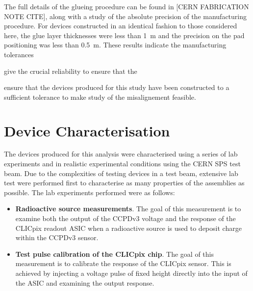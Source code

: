 The full details of the glueing procedure can be found in [CERN FABRICATION NOTE CITE], along with a study of the absolute precision of the manufacturing procedure.  For devices constructed in an identical fashion to those considered here, the glue layer thicknesses were less than 1~{\mu}m and the precision on the pad positioning was less than 0.5~{\mu}m.  These results indicate the manufacturing tolerances 

give the crucial reliability to ensure that the 

ensure that the devices produced for this study have been constructed to a sufficient  tolerance to make study of the misalignement feasible.  


\section{Device Characterisation}
The devices produced for this analysis were characterised using a series of lab experiments and in realistic experimental conditions using the CERN SPS test beam.  Due to the complexities of testing devices in a test beam, extensive lab test were performed first to characterise as many properties of the assemblies as possible.  The lab experiments performed were as follows:

\begin{itemize}
\item \textbf{Radioactive source measurements}.  The goal of this measurement is to examine both the output of the CCPDv3 voltage and the response of the CLICpix readout ASIC when a radioactive source is used to deposit charge within the CCPDv3 sensor.  
\item \textbf{Test pulse calibration of the CLICpix chip}.  The goal of this measurement is to calibrate the response of the CLICpix sensor.  This is achieved by injecting a voltage pulse of fixed height directly into the input of the ASIC and examining the output response.  
\end{itemize} 


